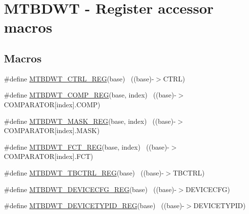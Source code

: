 \hypertarget{group___m_t_b_d_w_t___register___accessor___macros}{}\section{M\+T\+B\+D\+WT -\/ Register accessor macros}
\label{group___m_t_b_d_w_t___register___accessor___macros}
\subsection*{Macros}
\begin{DoxyCompactItemize}
\item 
\#define \hyperlink{group___m_t_b_d_w_t___register___accessor___macros_gadc89cd5cdeb4ac5157a15669485ec578}{M\+T\+B\+D\+W\+T\+\_\+\+C\+T\+R\+L\+\_\+\+R\+EG}(base)                                    ~((base)-\/$>$C\+T\+RL)
\item 
\#define \hyperlink{group___m_t_b_d_w_t___register___accessor___macros_gad57476689dc41b49e09cc1ba8202f8e4}{M\+T\+B\+D\+W\+T\+\_\+\+C\+O\+M\+P\+\_\+\+R\+EG}(base,  index)                        ~((base)-\/$>$C\+O\+M\+P\+A\+R\+A\+T\+OR\mbox{[}index\mbox{]}.C\+O\+MP)
\item 
\#define \hyperlink{group___m_t_b_d_w_t___register___accessor___macros_ga5c5b8f3ae38de9e3006737c92fc2814c}{M\+T\+B\+D\+W\+T\+\_\+\+M\+A\+S\+K\+\_\+\+R\+EG}(base,  index)                        ~((base)-\/$>$C\+O\+M\+P\+A\+R\+A\+T\+OR\mbox{[}index\mbox{]}.M\+A\+SK)
\item 
\#define \hyperlink{group___m_t_b_d_w_t___register___accessor___macros_gaa319e11200b9cc2fe7bfb0b5dd40d0e8}{M\+T\+B\+D\+W\+T\+\_\+\+F\+C\+T\+\_\+\+R\+EG}(base,  index)                          ~((base)-\/$>$C\+O\+M\+P\+A\+R\+A\+T\+OR\mbox{[}index\mbox{]}.F\+CT)
\item 
\#define \hyperlink{group___m_t_b_d_w_t___register___accessor___macros_ga8c3b4d03936e7f060a5c076768e31c3c}{M\+T\+B\+D\+W\+T\+\_\+\+T\+B\+C\+T\+R\+L\+\_\+\+R\+EG}(base)                                ~((base)-\/$>$T\+B\+C\+T\+RL)
\item 
\#define \hyperlink{group___m_t_b_d_w_t___register___accessor___macros_ga3e7e1df1d240c41eec01b0d5b166b40a}{M\+T\+B\+D\+W\+T\+\_\+\+D\+E\+V\+I\+C\+E\+C\+F\+G\+\_\+\+R\+EG}(base)                          ~((base)-\/$>$D\+E\+V\+I\+C\+E\+C\+FG)
\item 
\#define \hyperlink{group___m_t_b_d_w_t___register___accessor___macros_ga1b0104249607c6fb6ae3a943e3ffaa11}{M\+T\+B\+D\+W\+T\+\_\+\+D\+E\+V\+I\+C\+E\+T\+Y\+P\+I\+D\+\_\+\+R\+EG}(base)                      ~((base)-\/$>$D\+E\+V\+I\+C\+E\+T\+Y\+P\+ID)

\end{DoxyCompactItemize}
